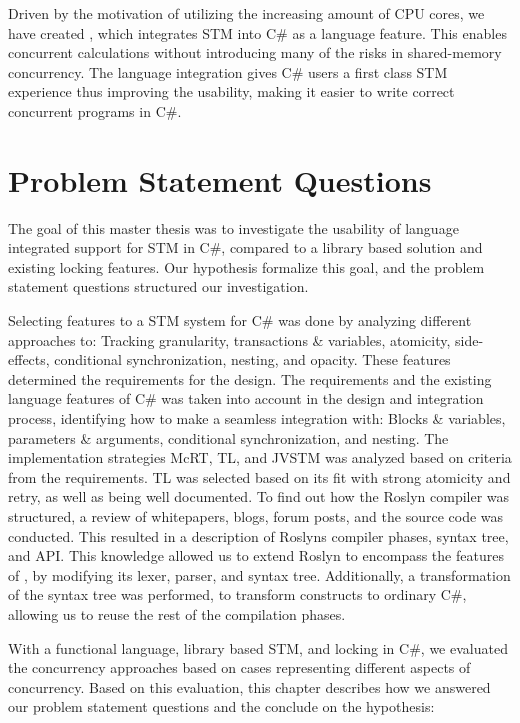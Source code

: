 \makeatletter {}\makeatother
{}
Driven by the motivation of utilizing the increasing amount of \ac{CPU} cores, we have created \stmname, which integrates \ac{STM} into C\# as a language feature. This enables concurrent calculations without introducing many of the risks in shared-memory concurrency. The language integration gives C\# users a first class \ac{STM} experience thus improving the usability, making it easier to write correct concurrent programs in C\#. 

\label{chap:conclusion}

\section{Problem Statement Questions}
The goal of this master thesis was to investigate the usability of language integrated support for \ac{STM} in C\#, compared to a library based solution and existing locking features. Our hypothesis formalize this goal, and the problem statement questions structured our investigation.

Selecting features to a \ac{STM} system for C\# was done by analyzing different approaches to: Tracking granularity, transactions \& variables, atomicity, side-effects, conditional synchronization, nesting, and opacity. These features determined the requirements for the design. The requirements and the existing language features of C\# was taken into account in the design and integration process, identifying how to make a seamless integration with: Blocks \& variables, parameters \& arguments, conditional synchronization, and nesting. The implementation strategies McRT, TL, and JVSTM was analyzed based on criteria from the requirements. TL was selected based on its fit with strong atomicity and retry, as well as being well documented. To find out how the Roslyn compiler was structured, a review of whitepapers, blogs, forum posts, and the source code was conducted. This resulted in a description of Roslyns compiler phases, syntax tree, and \ac{API}. This knowledge allowed us to extend Roslyn to encompass the features of \stmname, by modifying its lexer, parser, and syntax tree. Additionally, a transformation of the syntax tree was performed, to transform \stmname constructs to ordinary C\#, allowing us to reuse the rest of the compilation phases.

With a functional \stmname language, library based \ac{STM}, and locking in C\#, we evaluated the concurrency approaches based on cases representing different aspects of concurrency. Based on this evaluation, this chapter describes how we answered our problem statement questions and the conclude on the hypothesis: 

